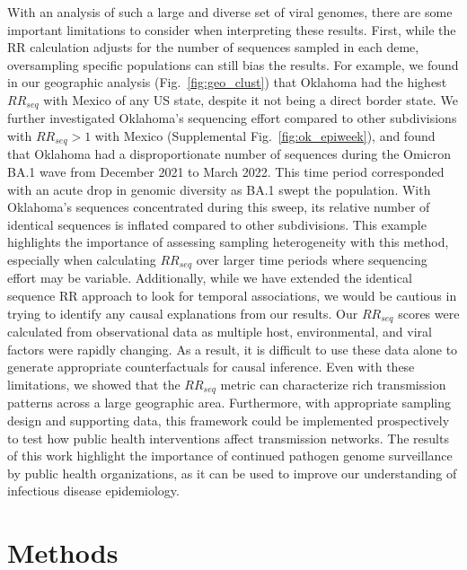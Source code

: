 \documentclass[11pt, letterpaper, oneside]{article}
\begin{document}
With an analysis of such a large and diverse set of viral genomes, there are some important limitations to consider when interpreting these results.
First, while the RR calculation adjusts for the number of sequences sampled in each deme, oversampling specific populations can still bias the results.
For example, we found in our geographic analysis (Fig.\ \ref{fig:geo_clust}) that Oklahoma had the highest $RR_{seq}$ with Mexico of any US state, despite it not being a direct border state.
We further investigated Oklahoma's sequencing effort compared to other subdivisions with $RR_{seq} > 1$ with Mexico (Supplemental Fig.\ \ref{fig:ok_epiweek}), and found that Oklahoma had a disproportionate number of sequences during the Omicron BA.1 wave from December 2021 to March 2022.
This time period corresponded with an acute drop in genomic diversity as BA.1 swept the population.\autocite{lythgoeLineageReplacementEvolution2023}
With Oklahoma's sequences concentrated during this sweep, its relative number of identical sequences is inflated compared to other subdivisions.
This example highlights the importance of assessing sampling heterogeneity with this method, especially when calculating $RR_{seq}$ over larger time periods where sequencing effort may be variable.
Additionally, while we have extended the identical sequence RR approach to look for temporal associations, we would be cautious in trying to identify any causal explanations from our results.
Our $RR_{seq}$ scores were calculated from observational data as multiple host, environmental, and viral factors were rapidly changing.
As a result, it is difficult to use these data alone to generate appropriate counterfactuals for causal inference.
Even with these limitations, we showed that the $RR_{seq}$ metric can characterize rich transmission patterns across a large geographic area.
Furthermore, with appropriate sampling design and supporting data, this framework could be implemented prospectively to test how public health interventions affect transmission networks.
The results of this work highlight the importance of continued pathogen genome surveillance by public health organizations, as it can be used to improve our understanding of infectious disease epidemiology.

\section{Methods}
\end{document}
